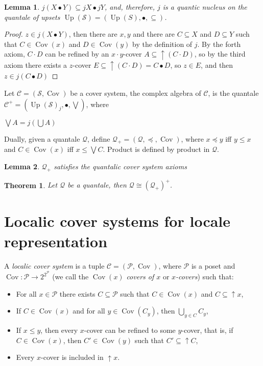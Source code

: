 \documentclass[a4paper]{article}
\theoremstyle{defin}
\theoremstyle{theorem}
\newtheorem{theorem}{Theorem}
\theoremstyle{claim}
\theoremstyle{prop}
\theoremstyle{lemma}
\newtheorem{lemma}{Lemma}
\theoremstyle{fact}
\theoremstyle{ex}
\theoremstyle{col}
\begin{document}
\begin{lemma}
$j (X \bullet Y) \subseteq j X \bullet j Y$, and, therefore, $j$ is a quantic nucleus on the quantale of upsets $\operatorname{Up}(\mathcal{S}) = (\operatorname{Up}(S), \bullet, \subseteq)$.
\end{lemma}

\begin{proof}
$z \in j (X \bullet Y)$, then there are $x, y$ and there are $C \subseteq X$ and $D \subseteq Y$ such that $C \in \operatorname{Cov}(x)$ and $D \in \operatorname{Cov}(y)$ by the definition of $j$. By the forth axiom, $C \cdot D$ can be refined by an $x \cdot y$-cover $A \subseteq \uparrow (C \cdot D)$, so by the third axiom there exists a $z$-cover $E \subseteq \uparrow (C \cdot D) = C \bullet D$, so $z \in E$, and then $z \in j (C \bullet D)$
\end{proof}

Let $\mathcal{C} = (\mathcal{S}, \operatorname{Cov})$ be a cover system, the complex algebra of $\mathcal{C}$, is the quantale $\mathcal{C}^{+} = (\operatorname{Up}(\mathcal{S})_j, \bullet, \bigvee)$, where
\begin{center}
$\bigvee A = j (\bigcup A)$
\end{center}

Dually, given a quantale $\mathcal{Q}$, define $\mathcal{Q}_+ = (\mathcal{Q}, \preceq, \operatorname{Cov})$, where
$x \preceq y$ iff $y \leq x$ and $C \in \operatorname{Cov}(x)$ iff $x \leq \bigvee C$. Product is defined by product in $\mathcal{Q}$.

\begin{lemma}
$\mathcal{Q}_+$ satisfies the quantalic cover system axioms
\end{lemma}

\begin{theorem}
Let $\mathcal{Q}$ be a quantale, then $\mathcal{Q} \cong (\mathcal{Q}_+)^+$.
\end{theorem}


\section{Localic cover systems for locale representation}

A \emph{localic cover system} is a tuple $\mathcal{C} = (\mathcal{P}, \operatorname{Cov})$, where $\mathcal{P}$ is a poset and $\operatorname{Cov} : \mathcal{P} \to 2^{2^{\mathcal{P}}}$ (we call the $\operatorname{Cov}(x)$ \emph{covers of $x$} or \emph{$x$-covers}) such that:
\begin{itemize}
\item For all $x \in \mathcal{P}$ there exists $C \subseteq \mathcal{P}$ such that $C \in \operatorname{Cov}(x)$ and $C \subseteq \uparrow x$,
\item If $C \in \operatorname{Cov}(x)$ and for all $y \in \operatorname{Cov}(C_y)$, then $\bigcup \limits_{y \in C} C_y$,
\item If $x \leq y$, then every $x$-cover can be refined to some $y$-cover, that is, if $C \in \operatorname{Cov}(x)$, then $C' \in \operatorname{Cov}(y)$ such that $C' \subseteq \uparrow C$,
\item Every $x$-cover is included in $\uparrow x$.
\end{itemize}
\end{document}
